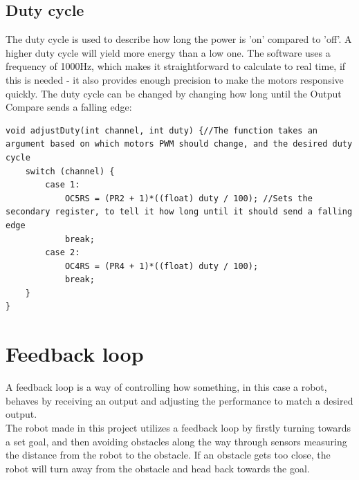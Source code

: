 \subsection {Duty cycle}

The duty cycle is used to describe how long the power is 'on' compared to 'off'. A higher duty cycle will yield more energy than a low one. The software uses a frequency of 1000Hz, which makes it straightforward to calculate to real time, if this is needed - it also provides enough precision to make the motors responsive quickly.
The duty cycle can be changed by changing how long until the Output Compare sends a falling edge:

\begin{lstlisting}
void adjustDuty(int channel, int duty) {//The function takes an argument based on which motors PWM should change, and the desired duty cycle
    switch (channel) { 
        case 1:
            OC5RS = (PR2 + 1)*((float) duty / 100); //Sets the secondary register, to tell it how long until it should send a falling edge
            break;
        case 2:
            OC4RS = (PR4 + 1)*((float) duty / 100);
            break;
    }
}
\end{lstlisting}

\section{Feedback loop}
A feedback loop is a way of controlling how something, in this case a robot, behaves by receiving an output and adjusting the performance to match a desired output.\\
The robot made in this project utilizes a feedback loop by firstly turning towards a set goal, and then avoiding obstacles along the way through sensors measuring the distance from the robot to the obstacle. If an obstacle gets too close, the robot will turn away from the obstacle and head back towards the goal.
